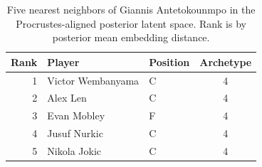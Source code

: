 \begin{table}[htbp]
  \centering\small
  \begin{tabular}{rllc}
    \toprule
    Rank & Player & Position & Archetype \\
    \midrule
    1 & Victor Wembanyama & C & 4 \\
    2 & Alex Len & C & 4 \\
    3 & Evan Mobley & F & 4 \\
    4 & Jusuf Nurkic & C & 4 \\
    5 & Nikola Jokic & C & 4 \\
    \bottomrule
  \end{tabular}
  \caption{Five nearest neighbors of Giannis Antetokounmpo in the Procrustes-aligned posterior latent space. Rank is by posterior mean embedding distance.}
  \label{tab:Giannis_Antetokounmpo_neighbors}
\end{table}

